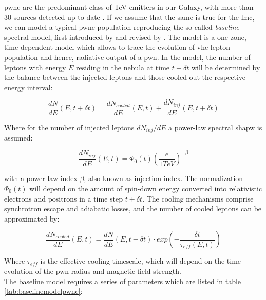 \documentclass[main.tex]{subfiles}
\begin{document}
\gls{pwne} are the predominant class of TeV emitters in our Galaxy, with more than 30 sources detected up to date \cite{2009TeVreview}. If we assume that the same is true for the \gls{lmc}, we can model a typical \gls{pwne} population reproducing the so called \textit{baseline} spectral model, first introduced by \cite{2012PWNemodel} and revised by \cite{2018hessPWNe}. The model is a one-zone, time-dependent model which allows to trace the evolution of \gls{vhe} lepton population and hence, radiative output of a \gls{pwn}.
In the model, the number of leptons with energy $E$ residing in the nebula at time $t+\delta t$ will be determined by the balance between the injected leptons and those cooled out the respective energy interval:

\begin{equation}
\frac{dN}{dE}(E, t+\delta t) = \frac{dN_{cooled}}{dE}(E,t) + \frac{dN_{inj}}{dE} (E, t+\delta t)  
\end{equation}

Where for the number of injected leptons $dN_{inj}/dE$ a power-law spectral shapw is assumed:

\begin{equation}
  \frac{dN_{inj}}{dE}(E,t) = \Phi_{0}(t) \left(\frac{e}{1 TeV} \right)^{-\beta}
\end{equation}

with a power-law index $\beta$, also known as injection index. The normalization $\Phi_0(t)$ will depend on the amount of spin-down energy converted into relativistic electrons and positrons in a time step $t+\delta t$.
The cooling mechanisms comprise synchrotron escape and adiabatic losses, and the number of cooled leptons can be approximated by:

\begin{equation}
  \frac{dN_{cooled}}{dE}(E, t) = \frac{dN}{dE} (E, t-\delta t)\cdot exp \left(-\frac{\delta t}{\tau_{eff}(E,t)} \right)
\end{equation}

Where $\tau_{eff}$ is the effective cooling timescale, which will depend on the time evolution of the \gls{pwn} radius and magnetic field strength.\\
The baseline model requires a series of parameters which are listed in table \ref{tab:baselinemodelpwne}:
\end{document}
